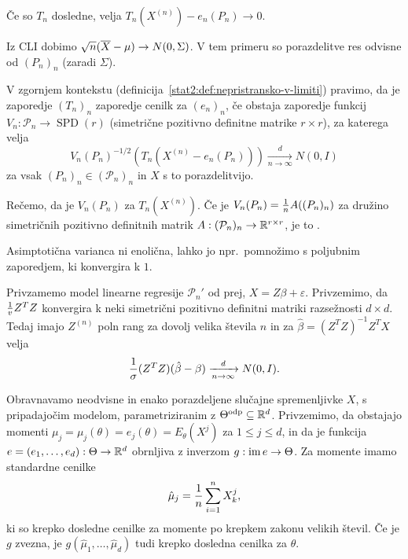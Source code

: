 \begin{primer}
  Če so $T_n$ dosledne, velja $T_n(X^{(n)}) - e_n(P_n) \to 0$.
\end{primer}

\begin{primer}
  Iz CLI dobimo $\sqrt{n} (\overline{X} - \mu) \to N(0, \Sigma)$.
  V tem primeru so porazdelitve res odvisne od $(P_n)_n$ (zaradi $\Sigma$).
\end{primer}


V zgornjem kontekstu (definicija~\ref{stat2:def:nepristransko-v-limiti})
pravimo, da je zaporedje $(T_n)_n$  zaporedje
cenilk za $(e_n)_n$, če obstaja zaporedje funkcij $V_n: \mathcal{P}_n \to
\operatorname{SPD}(r)$ (simetrične pozitivno definitne matrike $r \times r$), za
katerega velja
\[
  V_n(P_n)^{-1/2} (T_n(X^{(n)} - e_n(P_n))) \xrightarrow[n \to \infty]{d} N(0,
  I)
\]
za vsak $(P_n)_n \in (\mathcal{P}_n)_n$ in $X$ s to porazdelitvijo.

Rečemo, da je $V_n(P_n)$  za $T_n(X^{(n)})$.
Če je $V_n(P_n) = \frac{1}{n} A((P_n)_n)$ za družino simetričnih pozitivno
definitnih matrik $A: (\mathcal{P}_n)_n \to \mathbb{R}^{r \times r}$, je to
.

\begin{opomba}
  Asimptotična varianca ni enolična, lahko jo npr.~pomnožimo s poljubnim
  zaporedjem, ki konvergira k $1$.
\end{opomba}

\begin{izrek}
  Privzamemo model linearne regresije $\mathcal{P}_n'$ od prej, $X = Z \beta +
  \varepsilon$.
  Privzemimo, da $\frac{1}{v} Z^T Z$ konvergira k neki simetrični pozitivno
  definitni matriki razsežnosti $d \times d$.
  Tedaj imajo $Z^{(n)}$ poln rang za dovolj velika števila $n$ in za
  $\hat{\beta} = (Z^T Z)^{-1} Z^T X$ velja
  \[
	\frac{1}{\sigma} (Z^T Z) (\hat{\beta} - \beta) \xrightarrow[n \to \infty]{d}
	N(0, I).
  \]
\end{izrek}


Obravnavamo neodvisne in enako porazdeljene slučajne spremenljivke $X$, s
pripadajočim modelom, parametriziranim z $\Theta ^\text{\normalfont odp}\subseteq\mathbb{R}^d$.
Privzemimo, da obstajajo momenti $\mu_j = \mu_j(\theta) = e_j(\theta) =
E_\theta(X^j)$ za $1 \le j \le d$, in da je funkcija $e = (e_1, \ldots, e_d):
\Theta \to \mathbb{R}^d$ obrnljiva z inverzom $g: \operatorname{im} e \to \Theta$.
Za momente imamo standardne cenilke
\[
  \hat{\mu}_j = \frac{1}{n} \sum_{i=1}^n X_k^j,
\]
ki so krepko dosledne cenilke za momente po krepkem zakonu velikih števil.
Če je $g$ zvezna, je $g(\hat{\mu}_1, \ldots, \hat{\mu}_d)$ tudi krepko dosledna
cenilka za $\theta$.

